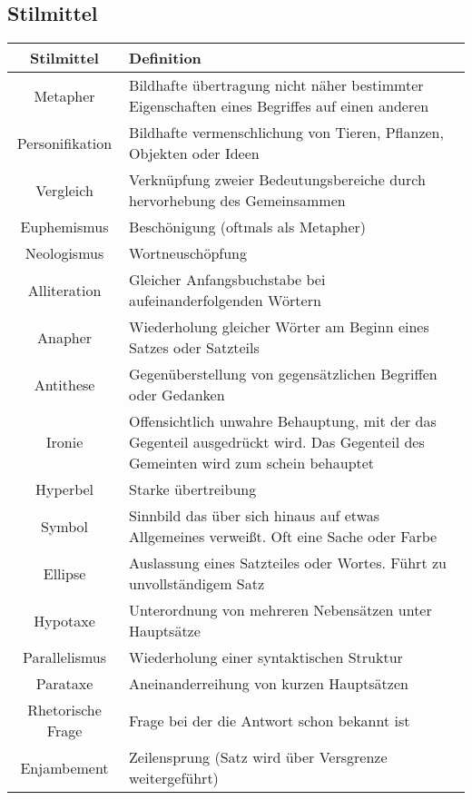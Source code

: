 
\subsection{Stilmittel}
\label{sec:stilmittel}

\setlength{\tabcolsep}{4pt}

\renewcommand{\arraystretch}{1.3}
\begin{tabularx}{\textwidth}{|c|X|}
    \hline
    Stilmittel & Definition \\
    \hline
    \hline
    Metapher & Bildhafte übertragung nicht näher bestimmter Eigenschaften eines Begriffes auf einen anderen \\
    \hline
    Personifikation & Bildhafte vermenschlichung von Tieren, Pflanzen, Objekten oder Ideen \\
    \hline
    Vergleich & Verknüpfung zweier Bedeutungsbereiche durch hervorhebung des Gemeinsammen \\
    \hline
    Euphemismus & Beschönigung (oftmals als Metapher) \\
    \hline
    Neologismus & Wortneuschöpfung \\
    \hline
    Alliteration & Gleicher Anfangsbuchstabe bei aufeinanderfolgenden Wörtern \\
    \hline
    Anapher & Wiederholung gleicher Wörter am Beginn eines Satzes oder Satzteils \\
    \hline
    Antithese & Gegenüberstellung von gegensätzlichen Begriffen oder Gedanken \\
    \hline 
    Ironie & Offensichtlich unwahre Behauptung, mit der das Gegenteil ausgedrückt wird. Das Gegenteil des Gemeinten wird zum schein behauptet \\
    \hline 
    Hyperbel & Starke übertreibung \\
    \hline
    Symbol & Sinnbild das über sich hinaus auf etwas Allgemeines verweißt. Oft eine Sache oder Farbe \\
    \hline
    Ellipse & Auslassung eines Satzteiles oder Wortes. Führt zu unvollständigem Satz \\
    \hline 
    Hypotaxe & Unterordnung von mehreren Nebensätzen unter Hauptsätze \\
    \hline
    Parallelismus & Wiederholung einer syntaktischen Struktur \\
    \hline
    Parataxe & Aneinanderreihung von kurzen Hauptsätzen \\
    \hline
    Rhetorische Frage & Frage bei der die Antwort schon bekannt ist \\
    \hline
    Enjambement & Zeilensprung (Satz wird über Versgrenze weitergeführt) \\
    \hline
\end{tabularx}
